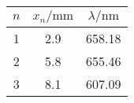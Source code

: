 \label{tab:tabwelle}
	\begin{tabular}{S[table-format=1.0]S[table-format=2.1]S[table-format=3.2]}
		\toprule
		{$n$} & {$x_n/ \si{\milli\meter}$} & {$\lambda/ \si{\nano\meter}$} \\
		 & 2.9 & 658.18 \\
		2 & 5.8 & 655.46 \\
		3 & 8.1 & 607.09 \\
		\bottomrule
	\end{tabular}
